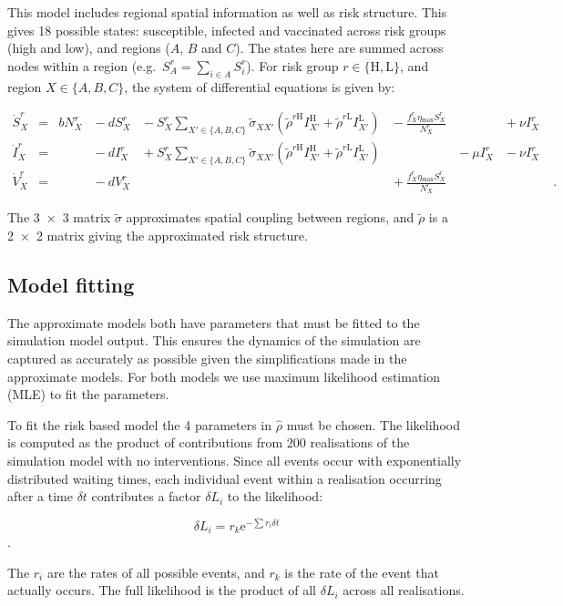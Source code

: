 This model includes regional spatial information as well as risk structure. This gives 18 possible states: susceptible, infected and vaccinated across risk groups (high and low), and regions ($A$, $B$ and $C$). The states here are summed across nodes within a region (e.g.\ $S^r_A = \sum_{i\in{}A}S^r_i$). For risk group $r\in{}\{\mathrm{H,L}\}$, and region $X\in{}\{A,B,C\}$, the system of differential equations is given by:
\begin{linenomath*}
    \begin{equation}
        \begin{alignedat}{7}
            \dot{S}^r_X &={} &bN^r_X &{}-{} dS^r_X &{}-{} S^r_X\sum_{X'\in\{A,B,C\}}\tilde{\sigma}_{XX'}\left(\tilde{\rho}^{r\mathrm{H}}I^{\mathrm{H}}_{X'} + \tilde{\rho}^{r\mathrm{L}}I^{\mathrm{L}}_{X'}\right) &{}-{} \frac{f^r_X\eta{}_\mathrm{max}S^r_X}{N^r_X} &&{}+{} \nu{}I^r_X \\
            \dot{I}^r_X &={}  &&{}-{} dI^r_X &{}+{} S^r_X\sum_{X'\in\{A,B,C\}}\tilde{\sigma}_{XX'}\left(\tilde{\rho}^{r\mathrm{H}}I^{\mathrm{H}}_{X'} + \tilde{\rho}^{r\mathrm{L}}I^{\mathrm{L}}_{X'}\right)& &{}-{} \mu{}I^r_X &{}-{} \nu{}I^r_X \\
            \dot{V}^r_X &={}  &&{}-{} dV^r_X &&{}+{} \frac{f^r_X\eta{}_\mathrm{max}S^r_X}{N^r_X}&&&\;.
        \end{alignedat}
        \label{eq:space_model}
    \end{equation}
\end{linenomath*}
The \num{3x3} matrix $\tilde{\sigma}$ approximates spatial coupling between regions, and $\tilde{\rho}$ is a \num{2x2} matrix giving the approximated risk structure.

\subsection{Model fitting}


The approximate models both have parameters that must be fitted to the simulation model output. This ensures the dynamics of the simulation are captured as accurately as possible given the simplifications made in the approximate models. For both models we use maximum likelihood estimation (MLE) to fit the parameters. 

To fit the risk based model the 4 parameters in $\hat{\rho}$ must be chosen. The likelihood is computed as the product of contributions from 200 realisations of the simulation model with no interventions. Since all events occur with exponentially distributed waiting times, each individual event within a realisation occurring after a time $\delta{}t$ contributes a factor $\delta{}L_i$ to the likelihood:
\begin{linenomath*}
$$\delta{}L_i = r_k\mathrm{e}^{-\sum{}r_i\delta{}t}$$\;.
\end{linenomath*}
The $r_i$ are the rates of all possible events, and $r_k$ is the rate of the event that actually occurs. The full likelihood is the product of all $\delta{}L_i$ across all realisations.

